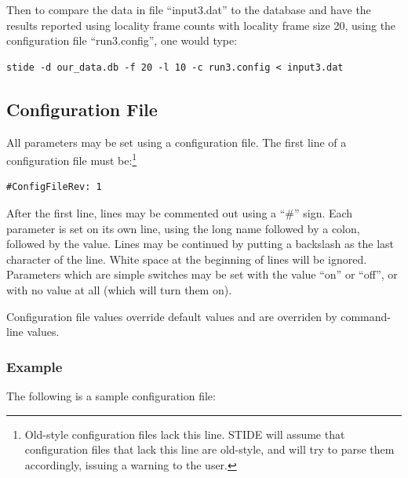 \documentclass{amsart}
\begin{document}
\vspace{5pt}

Then to compare the data in file ``input3.dat'' to the database and
have the results reported using locality frame counts with locality
frame size 20, using the configuration file ``run3.config'', one would
type:

\vspace{5pt}

\begin{verbatim}
stide -d our_data.db -f 20 -l 10 -c run3.config < input3.dat
\end{verbatim}

\vspace{5pt}

\subsection{Configuration File} \label{subsec:config}
All parameters may be set using a configuration file.  The first line
of a configuration file must be:\footnote{Old-style configuration
  files lack this line.  STIDE will assume that configuration files
  that lack this line are old-style, and will try to parse them
  accordingly, issuing a warning to the user.}

\vspace{5pt}

\begin{verbatim}
#ConfigFileRev: 1
\end{verbatim}

\vspace{5pt}

After the first line, lines may be commented out using a ``\#'' sign.
Each parameter is set on its own line, using the long name followed by
a colon, followed by the value.  Lines may be continued by putting a
backslash as the last character of the line.  White space at the
beginning of lines will be ignored.  Parameters which are simple
switches may be set with the value ``on'' or ``off'', or with no value
at all (which will turn them on).

Configuration file values override default values and are overriden
by command-line values.

\subsubsection{Example}

The following is a  sample configuration file:
\end{document}
